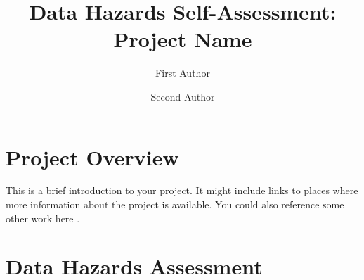 \documentclass[fleqn,10pt]{olplainarticle}
\title{Data Hazards Self-Assessment: Project Name}
\author[1]{First Author}
\author[2]{Second Author}
\affil[1]{Address of first author}
\affil[2]{Address of second author}
\begin{document}
\maketitle
\thispagestyle{empty}

\section*{Project Overview}

This is a brief introduction to your project. 
It might include links to places where more information about the project is available.
You could also reference some other work here \cite{exampleref}.

\section*{Data Hazards Assessment}
\end{document}
